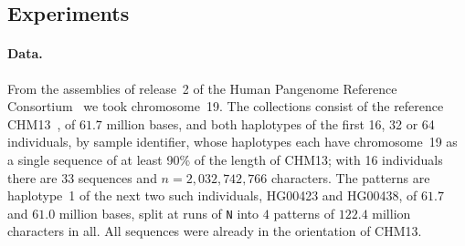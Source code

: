 \subsection{Experiments}
\label{sec:chr19-exp}

\paragraph*{Data.}
From the assemblies of release~2 of the Human Pangenome Reference
Consortium~\cite{HPRC2025,LucasEtAl2026} we took chromosome~19. The
collections consist of the reference CHM13~\cite{NurkEtAl2022}, of
$61.7$ million bases, and both haplotypes of the first 16, 32 or 64
individuals, by sample identifier, whose haplotypes each have
chromosome~19 as a single sequence of at least 90\% of the length of
CHM13; with 16 individuals there are 33 sequences and $n =
2{,}032{,}742{,}766$ characters. The patterns are haplotype~1 of the
next two such individuals, HG00423 and HG00438, of $61.7$ and $61.0$
million bases, split at runs of \texttt{N} into $4$ patterns of
$122.4$ million characters in all. All
sequences were already in the orientation of CHM13.

